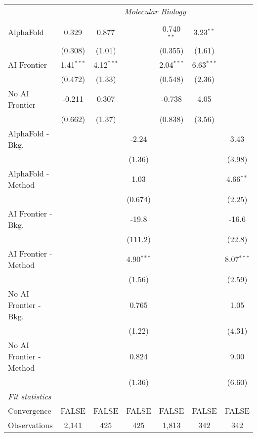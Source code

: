 \begin{tabular}{lcccccc}
 & \multicolumn{6}{c}{\textit{Molecular Biology}} \\ \\
   AlphaFold               & 0.329        & 0.877        &              & 0.740$^{**}$ & 3.23$^{**}$  &   \\   
                           & (0.308)      & (1.01)       &              & (0.355)      & (1.61)       &   \\   
   AI Frontier             & 1.41$^{***}$ & 4.12$^{***}$ &              & 2.04$^{***}$ & 6.63$^{***}$ &   \\   
                           & (0.472)      & (1.33)       &              & (0.548)      & (2.36)       &   \\   
   No AI Frontier          & -0.211       & 0.307        &              & -0.738       & 4.05         &   \\   
                           & (0.662)      & (1.37)       &              & (0.838)      & (3.56)       &   \\   
   AlphaFold - Bkg.        &              &              & -2.24        &              &              & 3.43\\   
                           &              &              & (1.36)       &              &              & (3.98)\\   
   AlphaFold - Method      &              &              & 1.03         &              &              & 4.66$^{**}$\\   
                           &              &              & (0.674)      &              &              & (2.25)\\   
   AI Frontier - Bkg.      &              &              & -19.8        &              &              & -16.6\\   
                           &              &              & (111.2)      &              &              & (22.8)\\   
   AI Frontier - Method    &              &              & 4.90$^{***}$ &              &              & 8.07$^{***}$\\   
                           &              &              & (1.56)       &              &              & (2.59)\\   
   No AI Frontier - Bkg.   &              &              & 0.765        &              &              & 1.05\\   
                           &              &              & (1.22)       &              &              & (4.31)\\   
   No AI Frontier - Method &              &              & 0.824        &              &              & 9.00\\   
                           &              &              & (1.36)       &              &              & (6.60)\\   
   \midrule
   \emph{Fit statistics}\\
   Convergence             &FALSE         & FALSE        & FALSE        & FALSE        & FALSE        & FALSE\\  
   Observations            & 2,141        & 425          & 425          & 1,813        & 342          & 342\\  
   

\end{tabular}
